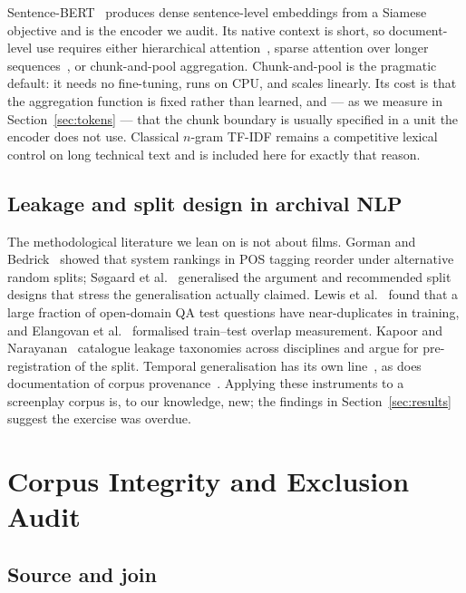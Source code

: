 \documentclass[conference,a4paper]{IEEEtran}
\begin{document}
Sentence-BERT~\cite{ref2} produces dense sentence-level embeddings from a
Siamese objective and is the encoder we audit. Its native context is
short, so document-level use requires either hierarchical
attention~\cite{ref19}, sparse attention over longer
sequences~\cite{ref1}, or chunk-and-pool aggregation. Chunk-and-pool is
the pragmatic default: it needs no fine-tuning, runs on CPU, and scales
linearly. Its cost is that the aggregation function is fixed rather than
learned, and --- as we measure in Section~\ref{sec:tokens} --- that the
chunk boundary is usually specified in a unit the encoder does not use.
Classical $n$-gram TF-IDF remains a competitive lexical control on long
technical text and is included here for exactly that reason.

\subsection{Leakage and split design in archival NLP}

The methodological literature we lean on is not about films. Gorman and
Bedrick~\cite{gorman2019} showed that system rankings in POS tagging
reorder under alternative random splits; S{\o}gaard et
al.~\cite{sogaard2021} generalised the argument and recommended split
designs that stress the generalisation actually claimed. Lewis et
al.~\cite{lewis2021} found that a large fraction of open-domain QA test
questions have near-duplicates in training, and Elangovan et
al.~\cite{elangovan2021} formalised train--test overlap measurement.
Kapoor and Narayanan~\cite{kapoor2023} catalogue leakage taxonomies
across disciplines and argue for pre-registration of the split.
Temporal generalisation has its own line~\cite{lazaridou2021}, as does
documentation of corpus provenance~\cite{bender2018,dodge2021}. Applying
these instruments to a screenplay corpus is, to our knowledge, new; the
findings in Section~\ref{sec:results} suggest the exercise was overdue.

\section{Corpus Integrity and Exclusion Audit}
\label{sec:corpus}

\subsection{Source and join}
\end{document}
